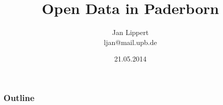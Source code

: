 \documentclass[10pt,a4paper]{beamer}
\author{Jan Lippert\\ljan@mail.upb.de}
\title{Open Data in Paderborn}
\date{21.05.2014}
\begin{document}
%

\begin{frame}
\titlepage
\end{frame}

\begin{frame}
\frametitle{Outline}
\tableofcontents[part=1,pausesections]
\end{frame}





\end{document}
